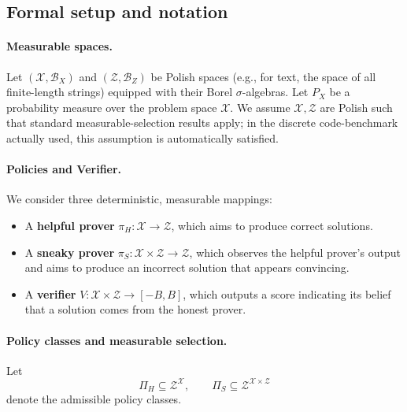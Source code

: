 \renewcommand{\thesection}{A}
\renewcommand{\thedefinition}{A.\arabic{definition}}
\renewcommand{\thetheorem}{A.\arabic{theorem}}
\renewcommand{\thelemma}{A.\arabic{lemma}}
\renewcommand{\theassumption}{A.\arabic{assumption}}
\setcounter{definition}{0}
\setcounter{theorem}{0}
\setcounter{lemma}{0}
\setcounter{assumption}{0}
\subsection{Formal setup and notation}

\paragraph{Measurable spaces.}
Let $(\mathcal{X}, \mathcal{B}_X)$ and $(\mathcal{Z}, \mathcal{B}_Z)$ be Polish spaces (e.g., for text, the space of all finite-length strings) equipped with their Borel $\sigma$-algebras. Let $P_X$ be a probability measure over the problem space $\mathcal{X}$. We assume $\mathcal X,\mathcal Z$ are Polish such that standard measurable-selection results apply; in the discrete code-benchmark actually used, this assumption is automatically satisfied.

\paragraph{Policies and Verifier.}
We consider three deterministic, measurable mappings:
\smallskip
\begin{itemize}
\item A \textbf{helpful prover} $\pi_H: \mathcal{X} \to \mathcal{Z}$, which aims to produce correct solutions.
\item A \textbf{sneaky prover} $\pi_S: \mathcal{X} \times \mathcal{Z} \to \mathcal{Z}$, which observes the helpful prover's output and aims to produce an incorrect solution that appears convincing.
\item A \textbf{verifier} $V: \mathcal{X} \times \mathcal{Z} \to [-B, B]$, which outputs a score indicating its belief that a solution comes from the honest prover.
\end{itemize}

\paragraph{Policy classes and measurable selection.}
Let
\[
  \Pi_H \subseteq \mathcal{Z}^{\mathcal{X}},
  \qquad
  \Pi_S \subseteq \mathcal{Z}^{\mathcal{X}\times\mathcal{Z}}
\]
denote the admissible policy classes.


